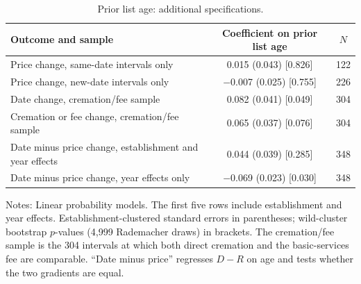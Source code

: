 \begin{table}[H]\centering\footnotesize
\caption{Prior list age: additional specifications.}\label{tab:A4}
\begin{tabular*}{\textwidth}{@{\extracolsep{\fill}}p{7cm}cc@{}}\toprule
Outcome and sample & Coefficient on prior list age & $N$ \\\midrule
Price change, same-date intervals only & 0.015 (0.043) [0.826] & 122 \\
Price change, new-date intervals only & $-$0.007 (0.025) [0.755] & 226 \\
Date change, cremation/fee sample & 0.082 (0.041) [0.049] & 304 \\
Cremation or fee change, cremation/fee sample & 0.065 (0.037) [0.076] & 304 \\
Date minus price change, establishment and year effects & 0.044 (0.039) [0.285] & 348 \\
Date minus price change, year effects only & $-$0.069 (0.023) [0.030] & 348 \\
\bottomrule\end{tabular*}
\begin{minipage}{\textwidth}\vspace{3pt}\scriptsize Notes: Linear probability models. The first five rows include establishment and year effects. Establishment-clustered standard errors in parentheses; wild-cluster bootstrap $p$-values (4,999 Rademacher draws) in brackets. The cremation/fee sample is the 304 intervals at which both direct cremation and the basic-services fee are comparable. ``Date minus price'' regresses $D-R$ on age and tests whether the two gradients are equal.\end{minipage}
\end{table}
